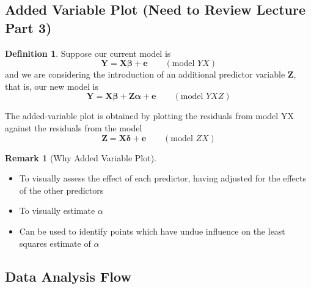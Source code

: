 \documentclass[11pt]{article}
\newcommand\VEC{\bm}{}
\theoremstyle{definition}
\newtheorem{definition}{Definition}[section]
\newtheorem{remark}{Remark}[section]
\numberwithin{equation}{section}
\begin{document}
\subsection{Added Variable Plot (Need to Review Lecture Part 3)}

\begin{definition}
  Suppose our current model is 
  \begin{equation}
    \VEC{Y}=\VEC{X \beta} + \VEC{e}\qquad(\text{model } YX)
  \end{equation}
  and we are considering the introduction of an additional predictor variable $\VEC{Z}$, that is, our new model is
  \begin{equation}
    \VEC{Y}=\VEC{X\beta + Z\alpha + e}\qquad(\text{model }YXZ)
  \end{equation}

  The added-variable plot is obtained by plotting the residuals from model YX against the residuals from the model
  \begin{equation}
    \VEC{Z}=\VEC{X\delta} + \VEC{e}\qquad(\text{model }ZX)
  \end{equation}
\end{definition}

\begin{remark}[Why Added Variable Plot]
 \begin{itemize}
 \item To visually assess the effect of each predictor, having adjusted for the effects of the other predictors
 \item To visually estimate $\alpha$
 \item Can be used to identify points which have undue influence on the least squares estimate of $\alpha$
 \end{itemize} 
\end{remark}

\subsection{Data Analysis Flow}
\end{document}
